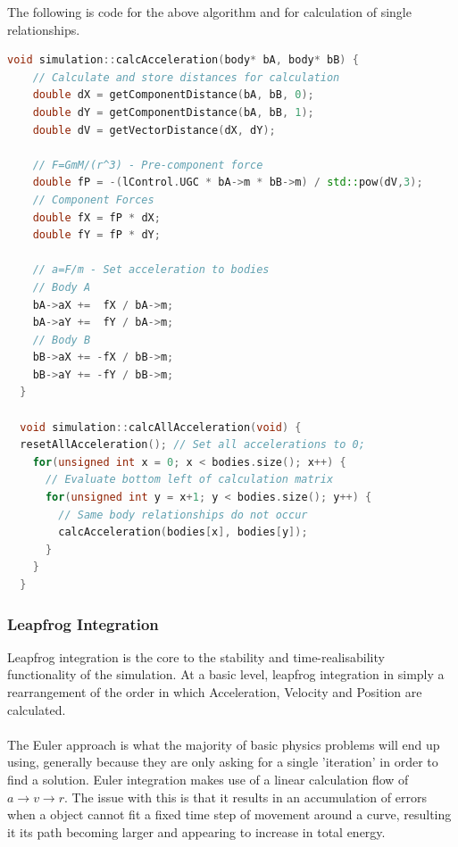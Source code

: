 \pagebreak

The following is code for the above algorithm and for calculation of single relationships.
\begin{lstlisting}[language=c++]
  void simulation::calcAcceleration(body* bA, body* bB) {
    // Calculate and store distances for calculation
    double dX = getComponentDistance(bA, bB, 0);
    double dY = getComponentDistance(bA, bB, 1);
    double dV = getVectorDistance(dX, dY);

    // F=GmM/(r^3) - Pre-component force
    double fP = -(lControl.UGC * bA->m * bB->m) / std::pow(dV,3);
    // Component Forces
    double fX = fP * dX;
    double fY = fP * dY;

    // a=F/m - Set acceleration to bodies
    // Body A
    bA->aX +=  fX / bA->m;
    bA->aY +=  fY / bA->m;
    // Body B
    bB->aX += -fX / bB->m;
    bB->aY += -fY / bB->m;
  }   
  
  void simulation::calcAllAcceleration(void) {
  resetAllAcceleration(); // Set all accelerations to 0;
    for(unsigned int x = 0; x < bodies.size(); x++) {
      // Evaluate bottom left of calculation matrix
      for(unsigned int y = x+1; y < bodies.size(); y++) {
        // Same body relationships do not occur
        calcAcceleration(bodies[x], bodies[y]);
      }
    } 
  }
\end{lstlisting}

\subsubsection{Leapfrog Integration}
Leapfrog integration is the core to the stability and time-realisability functionality of the simulation. At a basic level, leapfrog integration in simply a rearrangement of the order in which Acceleration, Velocity and Position are calculated.

\paragraph{}
The Euler approach is what the majority of basic physics problems will end up using, generally because they are only asking for a single 'iteration' in order to find a solution. Euler integration makes use of a linear calculation flow of $a\rightarrow v\rightarrow r$. The issue with this is that it results in an accumulation of errors when a object cannot fit a fixed time step of movement around a curve, resulting it its path becoming larger and appearing to increase in total energy.

